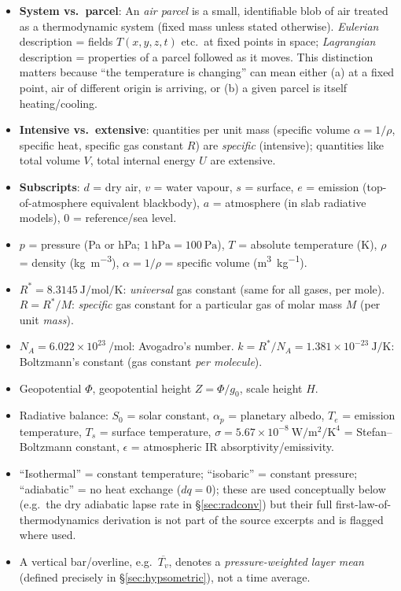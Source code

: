 \documentclass[11pt]{article}
\begin{document}
\begin{defbox}
\begin{itemize}[leftmargin=1.4em]
\item \textbf{System vs.\ parcel}: An \emph{air parcel} is a small, identifiable blob of air treated as a thermodynamic system (fixed mass unless stated otherwise). \emph{Eulerian} description = fields $T(x,y,z,t)$ etc.\ at fixed points in space; \emph{Lagrangian} description = properties of a parcel followed as it moves. This distinction matters because ``the temperature is changing'' can mean either (a) at a fixed point, air of different origin is arriving, or (b) a given parcel is itself heating/cooling.
\item \textbf{Intensive vs.\ extensive}: quantities per unit mass (specific volume $\alpha=1/\rho$, specific heat, specific gas constant $R$) are \emph{specific} (intensive); quantities like total volume $V$, total internal energy $U$ are extensive.
\item \textbf{Subscripts}: $d$ = dry air, $v$ = water vapour, $s$ = surface, $e$ = emission (top-of-atmosphere equivalent blackbody), $a$ = atmosphere (in slab radiative models), $0$ = reference/sea level.
\item $p$ = pressure (Pa or hPa; $1\ \text{hPa}=100\ \text{Pa}$), $T$ = absolute temperature (K), $\rho$ = density (\si{\kg\per\cubic\m}), $\alpha=1/\rho$ = specific volume (\si{\cubic\m\per\kg}).
\item $R^{*}=8.3145\ \si{\joule\per\mol\per\kelvin}$: \emph{universal} gas constant (same for all gases, per mole). $R = R^{*}/M$: \emph{specific} gas constant for a particular gas of molar mass $M$ (per unit \emph{mass}).
\item $N_A = 6.022\times10^{23}\ \si{\per\mol}$: Avogadro's number. $k = R^{*}/N_A = 1.381\times10^{-23}\ \si{\joule\per\kelvin}$: Boltzmann's constant (gas constant \emph{per molecule}).
\item Geopotential $\Phi$, geopotential height $Z=\Phi/g_0$, scale height $H$.
\item Radiative balance: $S_0$ = solar constant, $\alpha_p$ = planetary albedo, $T_e$ = emission temperature, $T_s$ = surface temperature, $\sigma=5.67\times10^{-8}\ \si{\watt\per\square\m\per\kelvin\tothe{4}}$ = Stefan--Boltzmann constant, $\epsilon$ = atmospheric IR absorptivity/emissivity.
\item ``Isothermal'' = constant temperature; ``isobaric'' = constant pressure; ``adiabatic'' = no heat exchange ($dq=0$); these are used conceptually below (e.g.\ the dry adiabatic lapse rate in \S\ref{sec:radconv}) but their full first-law-of-thermodynamics derivation is not part of the source excerpts and is flagged where used.
\item A vertical bar/overline, e.g.\ $\overline{T_v}$, denotes a \emph{pressure-weighted layer mean} (defined precisely in \S\ref{sec:hypsometric}), not a time average.
\end{itemize}
\end{defbox}
\end{document}
